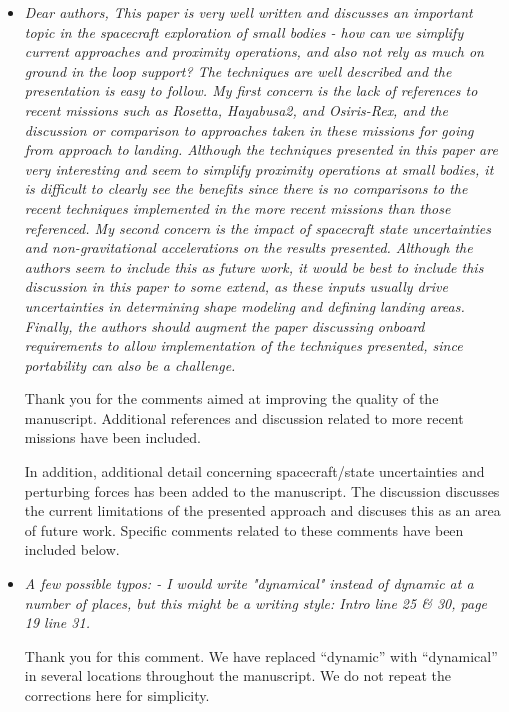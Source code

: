 \documentclass[11pt]{article}
\newcommand{\comment}[1]{\item \itshape #1 \normalfont}
\begin{document}
\begin{itemize}\setlength{\itemsep}{2\parsep}

\comment{    Dear authors,
This paper is very well written and discusses an important topic in the spacecraft exploration of small bodies - how can we simplify current approaches and proximity operations, and also not rely as much on ground in the loop support? The techniques are well described and the presentation is easy to follow.
My first concern is the lack of references to recent missions such as Rosetta, Hayabusa2, and Osiris-Rex, and the discussion or comparison to approaches taken in these missions for going from approach to landing. 
Although the techniques presented in this paper are very interesting and seem to simplify proximity operations at small bodies, it is difficult to clearly see the benefits since there is no comparisons to the recent techniques implemented in the more recent missions than those referenced.
My second concern is the impact of spacecraft state uncertainties and non-gravitational accelerations on the results presented.
Although the authors seem to include this as future work, it would be best to include this discussion in this paper to some extend, as these inputs usually drive uncertainties in determining shape modeling and defining landing areas.  
Finally, the authors should augment the paper discussing onboard requirements to allow implementation of the techniques presented, since portability can also be a challenge.

}

Thank you for the comments aimed at improving the quality of the manuscript. 
Additional references and discussion related to more recent missions have been included.

In addition, additional detail concerning spacecraft/state uncertainties and perturbing forces has been added to the manuscript.
The discussion discusses the current limitations of the presented approach and discuses this as an area of future work.
Specific comments related to these comments have been included below.

\comment{A few possible typos:
- I would write "dynamical" instead of dynamic at a number of places, but this might be a writing style: Intro line 25 \& 30, page 19 line 31.
}

Thank you for this comment. 
We have replaced ``dynamic'' with ``dynamical'' in several locations throughout the manuscript.
We do not repeat the corrections here for simplicity.


\end{itemize}
\end{document}
